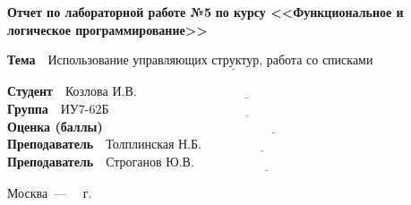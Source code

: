 \begin{titlepage}
	
	\begin{center}
		\Large\textbf{Отчет по лабораторной работе №5}
		\Large\textbf{по курсу <<Функциональное и логическое программирование>>}
	\end{center}


	\noindent\textbf{Тема} $\underline{\text{~~Использование управляющих структур, работа со списками~~~~~~~~~~~~~}}$\newline\newline\newline


	\noindent\textbf{Студент} $\underline{\text{~~Козлова И.В.~~~~~~~~~~~~~~~~~~~~~~~~~~~~~~~~~~~~~~~~~~~~~~~~~~~~~~~~~~~~~~~~~~~~~~~~}}$\newline\newline
	\noindent\textbf{Группа} $\underline{\text{~~ИУ7-62Б~~~~~~~~~~~~~~~~~~~~~~~~~~~~~~~~~~~~~~~~~~~~~~~~~~~~~~~~~~~~~~~~~~~~~~~~~~~~~~~~}}$\newline\newline
	\noindent\textbf{Оценка (баллы)} $\underline{\text{~~~~~~~~~~~~~~~~~~~~~~~~~~~~~~~~~~~~~~~~~~~~~~~~~~~~~~~~~~~~~~~~~~~~~~~~~~~~~~~~}}$\newline\newline
	\noindent\textbf{Преподаватель} $\underline{\text{~~Толплинская Н.Б.~~~~~~~~~~~~~~~~~~~~~~~~~~~~~~~~~~~~~~~~~~~~~~~~~~~~~~}}$\newline\newline
	\noindent\textbf{Преподаватель} $\underline{\text{~~Строганов Ю.В.~~~~~~~~~~~~~~~~~~~~~~~~~~~~~~~~~~~~~~~~~~~~~~~~~~~~~~~~~~}}$\newline
	
	\begin{center}
		\vfill
		Москва~---~\the\year
		~г.
	\end{center}
	\restoregeometry
\end{titlepage}

